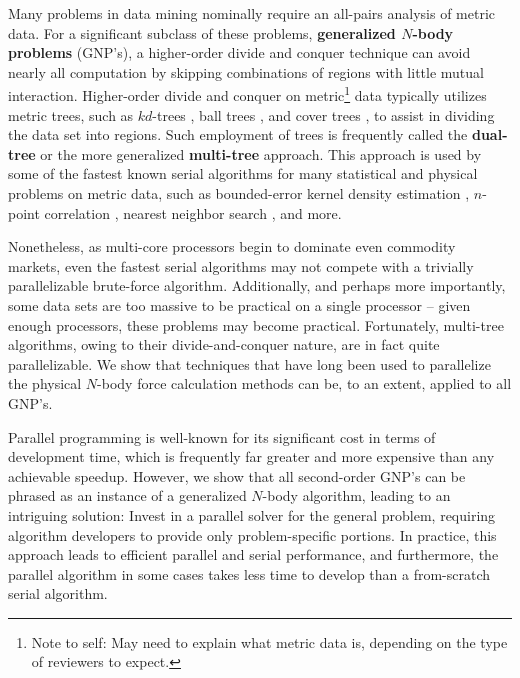 \documentclass[twoside,leqno,twocolumn]{article}
\newcommand{\THOR}{{{\tt THOR}} }
\newcommand{\authornote}[1]{\footnote{Note to self: #1}}
\newcommand{\authorsnote}[1]{\authornote{#1}}
\newcommand{\defterm}[1]{{\bf #1}}
\begin{document}
Many problems in data mining nominally require an all-pairs analysis of metric data.
For a significant subclass of these problems, \defterm{generalized $N$-body problems} (GNP's), a higher-order divide and conquer technique can avoid nearly all computation by skipping combinations of regions with little mutual interaction.
Higher-order divide and conquer on metric\authorsnote{May need to explain what metric data is, depending on the type of reviewers to expect.} data typically utilizes metric trees, such as $kd$-trees \cite{preparata_kdtrees}, ball trees \cite{balltrees}, and cover trees \cite{covertrees}, to assist in dividing the data set into regions.
Such employment of trees is frequently called the \defterm{dual-tree} or the more generalized \defterm{multi-tree} approach.
This approach is used by some of the fastest known serial algorithms for many statistical and physical problems on metric data, such as bounded-error kernel density estimation \cite{gray_kde, lee_gauss1, lee_gauss2}, $n$-point correlation \cite{gray_nbody}, nearest neighbor search \cite{ryan_nips}, and more.

Nonetheless, as multi-core processors begin to dominate even commodity markets, even the fastest serial algorithms may not compete with a trivially parallelizable brute-force algorithm.
Additionally, and perhaps more importantly, some data sets are too massive to be practical on a single processor -- given enough processors, these problems may become practical.
Fortunately, multi-tree algorithms, owing to their divide-and-conquer nature, are in fact quite parallelizable.
We show that techniques that have long been used to parallelize the physical $N$-body force calculation methods can be, to an extent, applied to all GNP's.

Parallel programming is well-known for its significant cost in terms of development time, which is frequently far greater and more expensive than any achievable speedup.
However, we show that all second-order GNP's can be phrased as an instance of a generalized $N$-body algorithm, leading to an intriguing solution: Invest in a parallel solver for the general problem, requiring algorithm developers to provide only problem-specific portions.
In practice, this approach leads to efficient parallel and serial performance, and furthermore, the parallel algorithm in some cases takes less time to develop than a from-scratch serial algorithm.

\end{document}
